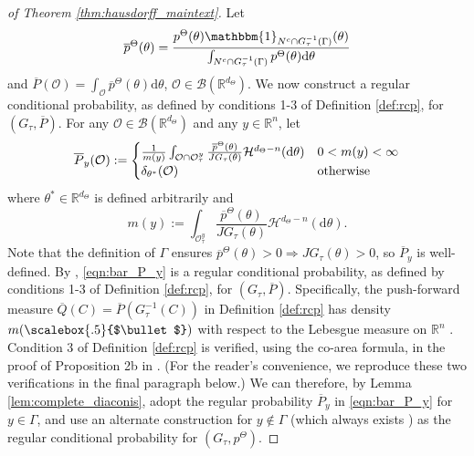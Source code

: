 \documentclass{amsart}
\renewcommand{\cdot}[1][.5]{%
  \mathbin{\vcenter{\hbox{\scalebox{#1}{$\bullet$}}}}%
}
\begin{document}
\begin{proof}[of Theorem \ref{thm:hausdorff_maintext}]
Let \begin{equation} \overline{p}^{\Theta}(\theta)= \frac{p^{\Theta}(\theta)\mathbbm{1}_{N^c \cap G_{\tau}^{-1}(\Gamma)}(\theta)}{\int_{N^c\cap G_{\tau}^{-1}(\Gamma)}p^{\Theta}(\theta)\mathrm{d}\theta} \label{eq:bar_lowercase_p}\end{equation} and $\overline{P}(\mathcal{O})=\int_{\mathcal{O}}\overline{p}^{\Theta}(\theta)\mathrm{d}\theta$, $\mathcal{O}\in\mathcal{B}(\mathbb{R}^{d_{\Theta}})$. We now construct a regular conditional probability, as defined by conditions 1-3 of Definition \ref{def:rcp}, for $(G_{\tau},\overline{P})$. For any $\mathcal{O}\in\mathcal{B}(\mathbb{R}^{d_{\Theta}})$ and
any $y\in\mathbb{R}^{n}$, let 
\begin{equation}
\overline{P}_{y}(\mathcal{O}):=\begin{cases}
\frac{1}{m(y)}\int_{\mathcal{O}\cap\mathcal{O}_{\tau}^{y}} \frac{\overline{p}^{\Theta}(\theta)}{JG_{\tau}(\theta)}\mathcal{H}^{d_{\Theta}-n}(\mathrm{d}\theta) & 0<m(y)<\infty\\
\delta_{\theta^{*}}(\mathcal{O}) & {\rm otherwise}
\end{cases}
\label{eqn:bar_P_y}
\end{equation}
where $\theta^{*}\in\mathbb{R}^{d_{\Theta}}$ is defined arbitrarily and
$$
m(y):=\int_{\mathcal{O}_{\tau}^{y}  }\frac{\overline{p}^{\Theta}(\theta)}{JG_{\tau}(\theta)}\mathcal{H}^{d_{\Theta}-n}(\mathrm{d}\theta).
$$
Note that the definition of $\Gamma$ ensures $\overline{p}^{\Theta}(\theta)>0 \Longrightarrow JG_\tau(\theta)>0$, so $\overline{P}_y$ is well-defined.  By \cite[Proposition 2]{coarea-diaconis},   \eqref{eqn:bar_P_y} is a regular conditional probability, as defined by conditions 1-3 of Definition \ref{def:rcp}, for $(G_{\tau},\overline{P})$. Specifically, the push-forward measure $\overline{Q}(C)=\overline{P}(G_{\tau}^{-1}(C))$ in Definition \ref{def:rcp} has density $m(\cdot)$ with respect to the Lebesgue measure on $\mathbb{R}^n$ \cite[Propostion 2a]{coarea-diaconis}. Condition 3 of Definition \ref{def:rcp} is verified, using the co-area formula, in the proof of Proposition 2b in \cite{coarea-diaconis}. (For the reader's convenience, we reproduce these two verifications in the final paragraph below.) We can therefore, by Lemma \ref{lem:complete_diaconis}, adopt the regular probability $\overline{P}_{y}$ in \eqref{eqn:bar_P_y} for $y\in \Gamma$,
and use an alternate construction for $y \notin \Gamma$ (which always exists \cite{rcp_def_parthasarathy}) as the regular conditional probability for $(G_{\tau},p^{\Theta})$. 



\end{proof}
\end{document}
